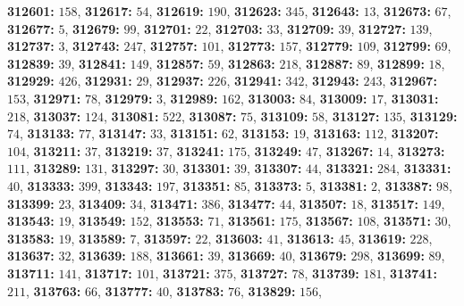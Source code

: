 \textsf{\bfseries 312601:} $158$, \textsf{\bfseries 312617:} $54$, \textsf{\bfseries 312619:} $190$, \textsf{\bfseries 312623:} $345$, \textsf{\bfseries 312643:} $13$, \textsf{\bfseries 312673:} $67$, \textsf{\bfseries 312677:} $5$, \textsf{\bfseries 312679:} $99$, \textsf{\bfseries 312701:} $22$, \textsf{\bfseries 312703:} $33$, \textsf{\bfseries 312709:} $39$, \textsf{\bfseries 312727:} $139$, \textsf{\bfseries 312737:} $3$, \textsf{\bfseries 312743:} $247$, \textsf{\bfseries 312757:} $101$, \textsf{\bfseries 312773:} $157$, \textsf{\bfseries 312779:} $109$, \textsf{\bfseries 312799:} $69$, \textsf{\bfseries 312839:} $39$, \textsf{\bfseries 312841:} $149$, \textsf{\bfseries 312857:} $59$, \textsf{\bfseries 312863:} $218$, \textsf{\bfseries 312887:} $89$, \textsf{\bfseries 312899:} $18$, \textsf{\bfseries 312929:} $426$, \textsf{\bfseries 312931:} $29$, \textsf{\bfseries 312937:} $226$, \textsf{\bfseries 312941:} $342$, \textsf{\bfseries 312943:} $243$, \textsf{\bfseries 312967:} $153$, \textsf{\bfseries 312971:} $78$, \textsf{\bfseries 312979:} $3$, \textsf{\bfseries 312989:} $162$, \textsf{\bfseries 313003:} $84$, \textsf{\bfseries 313009:} $17$, \textsf{\bfseries 313031:} $218$, \textsf{\bfseries 313037:} $124$, \textsf{\bfseries 313081:} $522$, \textsf{\bfseries 313087:} $75$, \textsf{\bfseries 313109:} $58$, \textsf{\bfseries 313127:} $135$, \textsf{\bfseries 313129:} $74$, \textsf{\bfseries 313133:} $77$, \textsf{\bfseries 313147:} $33$, \textsf{\bfseries 313151:} $62$, \textsf{\bfseries 313153:} $19$, \textsf{\bfseries 313163:} $112$, \textsf{\bfseries 313207:} $104$, \textsf{\bfseries 313211:} $37$, \textsf{\bfseries 313219:} $37$, \textsf{\bfseries 313241:} $175$, \textsf{\bfseries 313249:} $47$, \textsf{\bfseries 313267:} $14$, \textsf{\bfseries 313273:} $111$, \textsf{\bfseries 313289:} $131$, \textsf{\bfseries 313297:} $30$, \textsf{\bfseries 313301:} $39$, \textsf{\bfseries 313307:} $44$, \textsf{\bfseries 313321:} $284$, \textsf{\bfseries 313331:} $40$, \textsf{\bfseries 313333:} $399$, \textsf{\bfseries 313343:} $197$, \textsf{\bfseries 313351:} $85$, \textsf{\bfseries 313373:} $5$, \textsf{\bfseries 313381:} $2$, \textsf{\bfseries 313387:} $98$, \textsf{\bfseries 313399:} $23$, \textsf{\bfseries 313409:} $34$, \textsf{\bfseries 313471:} $386$, \textsf{\bfseries 313477:} $44$, \textsf{\bfseries 313507:} $18$, \textsf{\bfseries 313517:} $149$, \textsf{\bfseries 313543:} $19$, \textsf{\bfseries 313549:} $152$, \textsf{\bfseries 313553:} $71$, \textsf{\bfseries 313561:} $175$, \textsf{\bfseries 313567:} $108$, \textsf{\bfseries 313571:} $30$, \textsf{\bfseries 313583:} $19$, \textsf{\bfseries 313589:} $7$, \textsf{\bfseries 313597:} $22$, \textsf{\bfseries 313603:} $41$, \textsf{\bfseries 313613:} $45$, \textsf{\bfseries 313619:} $228$, \textsf{\bfseries 313637:} $32$, \textsf{\bfseries 313639:} $188$, \textsf{\bfseries 313661:} $39$, \textsf{\bfseries 313669:} $40$, \textsf{\bfseries 313679:} $298$, \textsf{\bfseries 313699:} $89$, \textsf{\bfseries 313711:} $141$, \textsf{\bfseries 313717:} $101$, \textsf{\bfseries 313721:} $375$, \textsf{\bfseries 313727:} $78$, \textsf{\bfseries 313739:} $181$, \textsf{\bfseries 313741:} $211$, \textsf{\bfseries 313763:} $66$, \textsf{\bfseries 313777:} $40$, \textsf{\bfseries 313783:} $76$, \textsf{\bfseries 313829:} $156$, 

